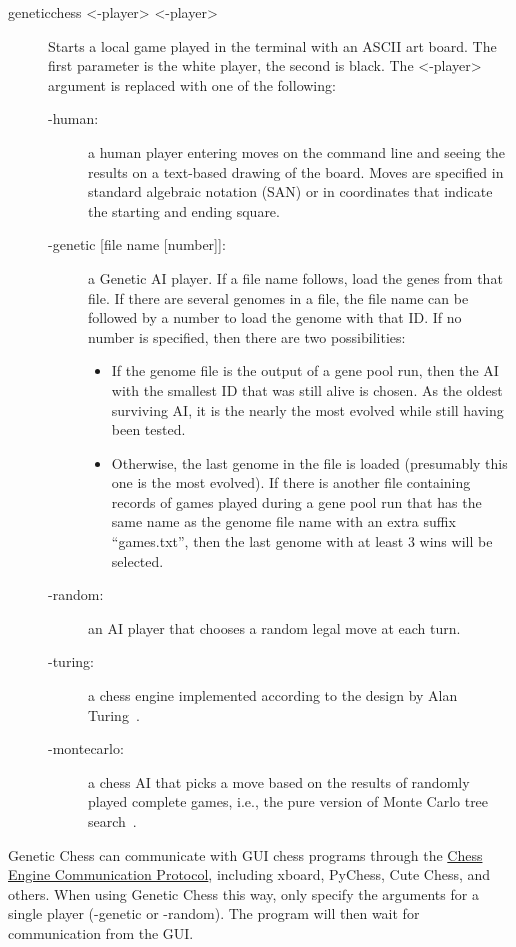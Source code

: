 \documentclass[letterpaper]{article}
\newcommand{\code}[1]{\small\textsf{#1}}
\renewcommand{\_}{\allowbreak\textunderscore\allowbreak}
\begin{document}
\begin{description}
	\item[\code{genetic\_chess <-player> <-player>}] Starts a local game played in the terminal with an ASCII art board. The first parameter is the white player, the second is black. The \code{<-player>} argument is replaced with one of the following:
	\begin{description}
		\item[\code{-human}:] a human player entering moves on the command line and seeing the results on a text-based drawing of the board. Moves are specified in standard algebraic notation (SAN) or in coordinates that indicate the starting and ending square.
		\item[\code{-genetic [file name [number]]}:] a Genetic AI player. If a file name follows, load the genes from that file. If there are several genomes in a file, the file name can be followed by a number to load the genome with that ID\@. If no number is specified, then there are two possibilities:
		\begin{itemize}
			\item If the genome file is the output of a gene pool run, then the AI with the smallest ID that was still alive is chosen. As the oldest surviving AI, it is the nearly the most evolved while still having been tested.
			\item Otherwise, the last genome in the file is loaded (presumably this one is the most evolved). If there is another file containing records of games played during a gene pool run that has the same name as the genome file name with an extra suffix ``\_games.txt'', then the last genome with at least 3 wins will be selected.
		\end{itemize}
		\item[\code{-random}:] an AI player that chooses a random legal move at each turn.
		\item[\code{-turing}:] a chess engine implemented according to the design by Alan Turing~\cite{turing-chess}.
		\item[\code{-montecarlo}:] a chess AI that picks a move based on the results of randomly played complete games, i.e., the pure version of Monte Carlo tree search~\cite{monte-carlo}.
	\end{description}
\end{description}
Genetic Chess can communicate with GUI chess programs through the \href{https://www.gnu.org/software/xboard/engine-intf.html}{Chess Engine Communication Protocol}, including xboard, PyChess, Cute Chess, and others. When using Genetic Chess this way, only specify the arguments for a single player (\code{-genetic} or \code{-random}). The program will then wait for communication from the GUI\@.
\end{document}

